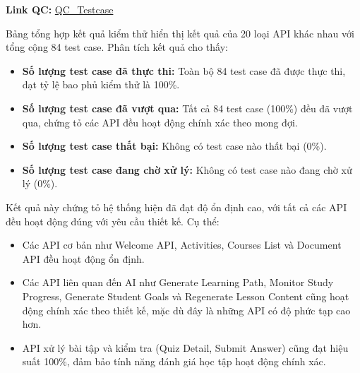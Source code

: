 \par \textbf{Link QC:} \textcolor{blue}{\href{https://docs.google.com/spreadsheets/d/18kxb6KiawU2gpdIucJwOxST4YF0WvIga/edit?usp=sharing&ouid=101371782687204831060&rtpof=true&sd=true}{QC\_Testcase}}

Bảng tổng hợp kết quả kiểm thử hiển thị kết quả của 20 loại API khác nhau với tổng cộng 84 test case. Phân tích kết quả cho thấy:

\begin{itemize}
    \item \textbf{Số lượng test case đã thực thi:} Toàn bộ 84 test case đã được thực thi, đạt tỷ lệ bao phủ kiểm thử là 100\%.
    \item \textbf{Số lượng test case đã vượt qua:} Tất cả 84 test case (100\%) đều đã vượt qua, chứng tỏ các API đều hoạt động chính xác theo mong đợi.
    \item \textbf{Số lượng test case thất bại:} Không có test case nào thất bại (0\%).
    \item \textbf{Số lượng test case đang chờ xử lý:} Không có test case nào đang chờ xử lý (0\%).
\end{itemize}

Kết quả này chứng tỏ hệ thống hiện đã đạt độ ổn định cao, với tất cả các API đều hoạt động đúng với yêu cầu thiết kế. Cụ thể:

\begin{itemize}
    \item Các API cơ bản như Welcome API, Activities, Courses List và Document API đều hoạt động ổn định.
    \item Các API liên quan đến AI như Generate Learning Path, Monitor Study Progress, Generate Student Goals và Regenerate Lesson Content cũng hoạt động chính xác theo thiết kế, mặc dù đây là những API có độ phức tạp cao hơn.
    \item API xử lý bài tập và kiểm tra (Quiz Detail, Submit Answer) cũng đạt hiệu suất 100\%, đảm bảo tính năng đánh giá học tập hoạt động chính xác.
\end{itemize}
